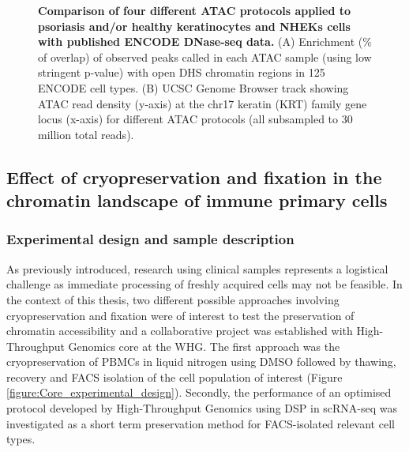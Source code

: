 \begin{figure}[H]
\begin{subfigure}{0.65\textwidth}
\caption{\textbf{}}
\end{subfigure}
\caption[Comparison of 4 different ATAC protocols applied to psoriasis and/or healthy keratinocytes and NHEKs cells with published ENCODE DNase-seq data.]{\textbf{Comparison of four different ATAC protocols applied to psoriasis and/or healthy keratinocytes and NHEKs cells with published ENCODE DNase-seq data.} (A) Enrichment (\% of overlap) of observed peaks called in each ATAC sample (using low stringent p-value) with open DHS chromatin regions in 125 ENCODE cell types. (B) UCSC Genome Browser track showing ATAC read density (y-axis) at the chr17 keratin (KRT) family gene locus (x-axis) for different ATAC protocols (all subsampled to 30 million total reads).}
\label{figure:ATAC_skin_ENCODE_overlap_and_tracks}
\end{figure} 
\smallskip

	
\subsection{Effect of cryopreservation and fixation in the chromatin landscape of immune primary cells}
\label{Core}
\subsubsection{Experimental design and sample description}
As previously introduced, research using clinical samples represents a logistical challenge as immediate processing of freshly acquired cells may not be feasible. In the context of this thesis, two different possible approaches involving cryopreservation and fixation were of interest to test the preservation of chromatin accessibility and a collaborative project was established with High-Throughput Genomics core at the WHG. The first approach was the cryopreservation of PBMCs in liquid nitrogen using DMSO followed by thawing, recovery and FACS isolation of the cell population of interest (Figure \ref{figure:Core_experimental_design}). Secondly, the performance of an optimised protocol developed by High-Throughput Genomics using DSP in scRNA-seq \parencite{Attar2018} was investigated as a short term preservation method for FACS-isolated relevant cell types.

